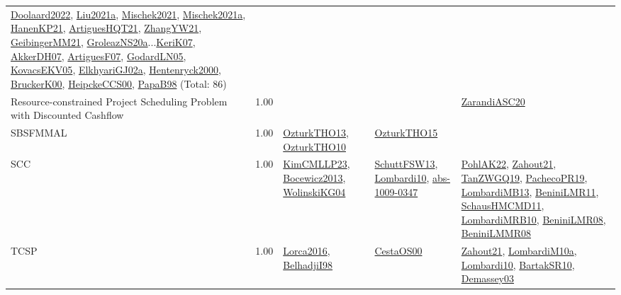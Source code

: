 {\begin{longtable}{p{3cm}r>{\raggedright\arraybackslash}p{6cm}>{\raggedright\arraybackslash}p{6cm}>{\raggedright\arraybackslash}p{8cm}}
\hyperref[detail:Doolaard2022]{Doolaard2022}, \hyperref[detail:Liu2021a]{Liu2021a}, \hyperref[detail:Mischek2021]{Mischek2021}, \hyperref[detail:Mischek2021a]{Mischek2021a}, \hyperref[detail:HanenKP21]{HanenKP21}, \hyperref[detail:ArtiguesHQT21]{ArtiguesHQT21}, \hyperref[detail:ZhangYW21]{ZhangYW21}, \hyperref[detail:GeibingerMM21]{GeibingerMM21}, \hyperref[detail:GroleazNS20a]{GroleazNS20a}...\hyperref[detail:KeriK07]{KeriK07}, \hyperref[detail:AkkerDH07]{AkkerDH07}, \hyperref[detail:ArtiguesF07]{ArtiguesF07}, \hyperref[detail:GodardLN05]{GodardLN05}, \hyperref[detail:KovacsEKV05]{KovacsEKV05}, \hyperref[detail:ElkhyariGJ02a]{ElkhyariGJ02a}, \hyperref[detail:Hentenryck2000]{Hentenryck2000}, \hyperref[detail:BruckerK00]{BruckerK00}, \hyperref[detail:HeipckeCCS00]{HeipckeCCS00}, \hyperref[detail:PapaB98]{PapaB98} (Total: 86)\\
\index{Resource-constrained Project Scheduling Problem with Discounted Cashflow}\index{Classification!Resource-constrained Project Scheduling Problem with Discounted Cashflow}Resource-constrained Project Scheduling Problem with Discounted Cashflow &  1.00 &  &  & \hyperref[detail:ZarandiASC20]{ZarandiASC20}\\
\index{SBSFMMAL}\index{Classification!SBSFMMAL}SBSFMMAL &  1.00 & \hyperref[detail:OzturkTHO13]{OzturkTHO13}, \hyperref[detail:OzturkTHO10]{OzturkTHO10} & \hyperref[detail:OzturkTHO15]{OzturkTHO15} & \\
\index{SCC}\index{Classification!SCC}SCC &  1.00 & \hyperref[detail:KimCMLLP23]{KimCMLLP23}, \hyperref[detail:Bocewicz2013]{Bocewicz2013}, \hyperref[detail:WolinskiKG04]{WolinskiKG04} & \hyperref[detail:SchuttFSW13]{SchuttFSW13}, \hyperref[detail:Lombardi10]{Lombardi10}, \hyperref[detail:abs-1009-0347]{abs-1009-0347} & \hyperref[detail:PohlAK22]{PohlAK22}, \hyperref[detail:Zahout21]{Zahout21}, \hyperref[detail:TanZWGQ19]{TanZWGQ19}, \hyperref[detail:PachecoPR19]{PachecoPR19}, \hyperref[detail:LombardiMB13]{LombardiMB13}, \hyperref[detail:BeniniLMR11]{BeniniLMR11}, \hyperref[detail:SchausHMCMD11]{SchausHMCMD11}, \hyperref[detail:LombardiMRB10]{LombardiMRB10}, \hyperref[detail:BeniniLMR08]{BeniniLMR08}, \hyperref[detail:BeniniLMMR08]{BeniniLMMR08}\\
\index{TCSP}\index{Classification!TCSP}TCSP &  1.00 & \hyperref[detail:Lorca2016]{Lorca2016}, \hyperref[detail:BelhadjiI98]{BelhadjiI98} & \hyperref[detail:CestaOS00]{CestaOS00} & \hyperref[detail:Zahout21]{Zahout21}, \hyperref[detail:LombardiM10a]{LombardiM10a}, \hyperref[detail:Lombardi10]{Lombardi10}, \hyperref[detail:BartakSR10]{BartakSR10}, \hyperref[detail:Demassey03]{Demassey03}\\

\end{longtable}}
